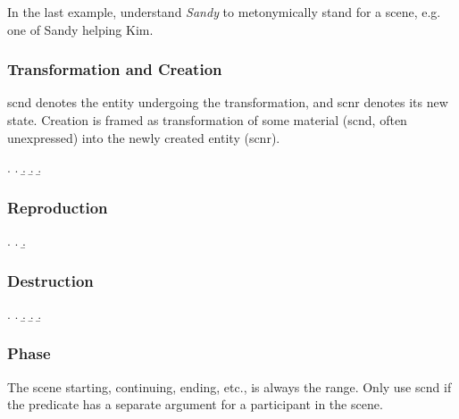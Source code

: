 \documentclass[a4paper]{article}
\begin{document}
In the last example, understand \emph{Sandy} to metonymically stand for a scene,
e.g. one of Sandy helping Kim.

\subsubsection{Transformation and Creation}

\textsf{scnd} denotes the entity undergoing the transformation, and
\textsf{scnr} denotes its new state. Creation is framed as transformation of
some material (\textsf{scnd}, often unexpressed) into the newly created entity
(\textsf{scnr}).

\ex. \a. 
     \b. 
     \b. 
     \b. 

\subsubsection{Reproduction}

\ex. \a. 
     \b. 

\subsubsection{Destruction}

\ex. \a. 
     \b. 
     \b. 
     \b. 

%
%

\subsubsection{Phase}

The scene starting, continuing, ending, etc., is always the range. Only use
\textsf{scnd} if the predicate has a separate argument for a participant in the
scene.
\end{document}
